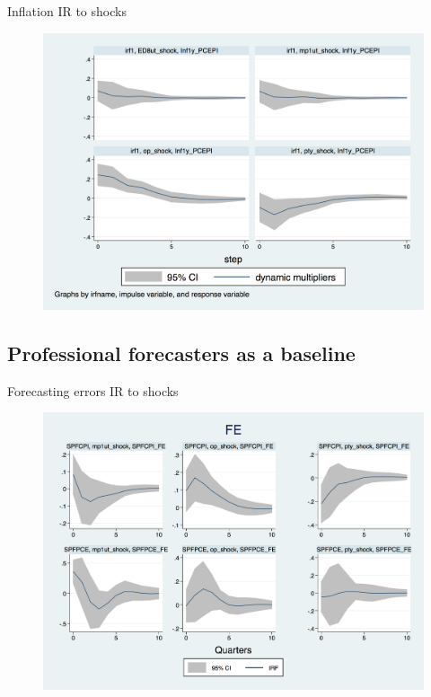\documentclass{beamer}
\begin{document}
\begin{frame}{Inflation IR to  shocks}

\begin{figure}
	\includegraphics[scale=0.3]{figures/PCEPI_ashocks.png} 
\end{figure}

\end{frame}

\subsection{Professional forecasters as a baseline }

\begin{frame}{Forecasting errors IR to  shocks}

\begin{figure}
	\includegraphics[scale=0.3]{figures/SPFFE_ashocks.png} 
\end{figure}

\end{frame}
\end{document}

